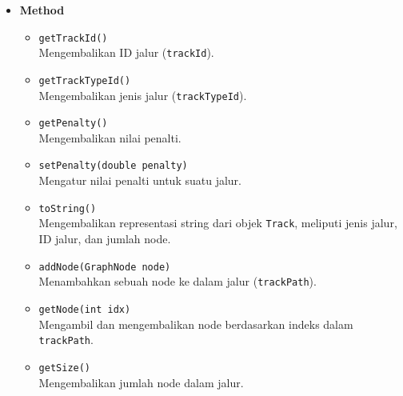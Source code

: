 \begin{itemize}
    \item \textbf{Method}
    \begin{itemize}
        \item \texttt{getTrackId()}
        \\ Mengembalikan ID jalur (\texttt{trackId}).
        \item \texttt{getTrackTypeId()}
        \\ Mengembalikan jenis jalur (\texttt{trackTypeId}).
        \item \texttt{getPenalty()}
        \\ Mengembalikan nilai penalti.
        \item \texttt{setPenalty(double penalty)}
        \\ Mengatur nilai penalti untuk suatu jalur.
        \item \texttt{toString()}
        \\ Mengembalikan representasi string dari objek \texttt{Track}, meliputi jenis jalur, ID jalur, dan jumlah node.
        \item \texttt{addNode(GraphNode node)}
        \\ Menambahkan sebuah node ke dalam jalur (\texttt{trackPath}).
        \item \texttt{getNode(int idx)}
        \\ Mengambil dan mengembalikan node berdasarkan indeks dalam \texttt{trackPath}.
        \item \texttt{getSize()}
        \\ Mengembalikan jumlah node dalam jalur.
    \end{itemize}
\end{itemize}
\newpage
